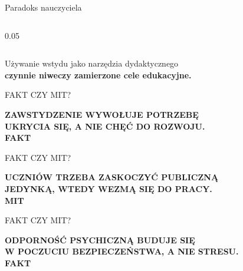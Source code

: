 \documentclass[10pt, aspectratio=169]{beamer}
\begin{document}
\begin{frame}{Paradoks nauczyciela}
\begin{columns}[T]
        \begin{column}{0.05\textwidth}
        \end{column}
    \end{columns}
    
    \vspace{1.2cm}
    \pause
    
    \begin{center}
        \normalsize\textcolor{textPrimary}{Używanie wstydu jako narzędzia dydaktycznego}\\
        \vspace{0.15cm}
        \large\textbf{\textcolor{accentCoral}{czynnie niweczy zamierzone cele edukacyjne.}}
    \end{center}
\end{frame}

\begin{frame}{FAKT CZY MIT?}
    \vfill
    \begin{center}
        {\Large\sffamily\bfseries\textcolor{primaryNavy}{
        ZAWSTYDZENIE WYWOŁUJE POTRZEBĘ\\
        UKRYCIA SIĘ, A NIE CHĘĆ DO ROZWOJU.
        }}\\[1.2cm]
        
        \pause
        {\fontsize{50}{60}\selectfont\sffamily\bfseries\textcolor{accentTeal}{FAKT}}
    \end{center}
    \vfill
\end{frame}

\begin{frame}{FAKT CZY MIT?}
    \vfill
    \begin{center}
        {\Large\sffamily\bfseries\textcolor{primaryNavy}{
        UCZNIÓW TRZEBA ZASKOCZYĆ PUBLICZNĄ\\
        JEDYNKĄ, WTEDY WEZMĄ SIĘ DO PRACY.
        }}\\[1.2cm]
        
        \pause
        {\fontsize{50}{60}\selectfont\sffamily\bfseries\textcolor{accentCoral}{MIT}}
    \end{center}
    \vfill
\end{frame}

\begin{frame}{FAKT CZY MIT?}
    \vfill
    \begin{center}
        {\Large\sffamily\bfseries\textcolor{primaryNavy}{
        ODPORNOŚĆ PSYCHICZNĄ BUDUJE SIĘ\\
        W POCZUCIU BEZPIECZEŃSTWA, A NIE STRESU.
        }}\\[1.2cm]
        
        \pause
        {\fontsize{50}{60}\selectfont\sffamily\bfseries\textcolor{accentTeal}{FAKT}}
    \end{center}
    \vfill
\end{frame}
\end{document}
